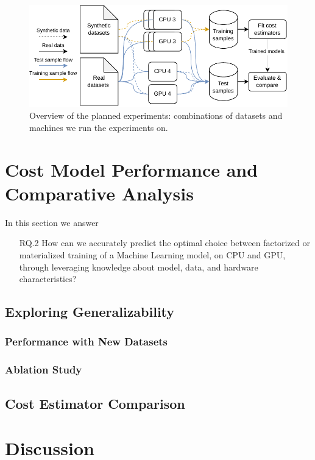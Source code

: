 \begin{figure}[ht]
  \centering
  \includegraphics[width=0.8\linewidth]{chapters/06_evaluation/figures/experiment-pipeline.pdf}
  \caption{ Overview of the planned experiments: combinations of datasets and machines we run the experiments
    on. }
  \label{fig:enter-label}
\end{figure}



\section{Cost Model Performance and Comparative Analysis}
\label{sec:eval-model-evaluation}

In this section we answer
\begin{itemize}
  \item[RQ.2] How can we accurately predict the optimal choice between factorized or materialized training of a Machine Learning model, on CPU and GPU, through leveraging knowledge about model, data, and hardware characteristics?
\end{itemize}

\subsection{Exploring Generalizability}
\subsubsection{Performance with New Datasets}

\subsubsection{Ablation Study}


\subsection{Cost Estimator Comparison}


\section{Discussion}
\label{sec:eval-discussion}

